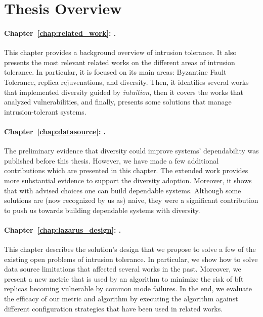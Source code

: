 \section{Thesis Overview}
\paragraph{Chapter~\ref{chap:related_work}: .}
This chapter provides a background overview of intrusion tolerance. 
It also presents the most relevant related works on the different areas of intrusion tolerance.
In particular, it is focused on its main areas: Byzantine Fault Tolerance, replica rejuvenations, and diversity.
Then, it identifies several works that implemented diversity guided by \emph{intuition}, then it covers the works that analyzed vulnerabilities, and finally, presents some solutions that manage intrusion-tolerant systems.


\paragraph{Chapter~\ref{chap:datasource}: .}
The preliminary evidence that diversity could improve systems' dependability was published before this thesis. 
However, we have made a few additional contributions which are presented in this chapter. 
The extended work provides more substantial evidence to support the diversity adoption.
Moreover, it shows that with advised choices one can build dependable systems.
Although some solutions are (now recognized by us as) naive, they were a significant contribution to push us towards building dependable systems with diversity.


\paragraph{Chapter~\ref{chap:lazarus_design}: .}
This chapter describes the solution's design that we propose to solve a few of the existing open problems of intrusion tolerance.
In particular, we show how to solve data source limitations that affected several works in the past.
Moreover, we present a new metric that is used by an algorithm to minimize the risk of \gls{bft} replicas becoming vulnerable by common mode failures.
In the end, we evaluate the efficacy of our metric and algorithm by executing the algorithm against different configuration strategies that have been used in related works.


